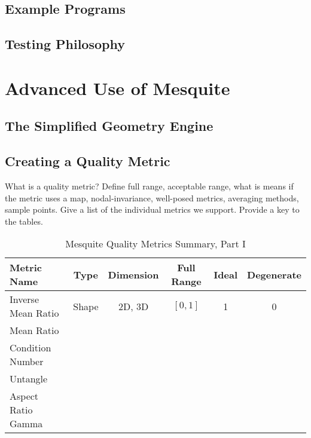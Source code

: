 \subsection{Example Programs}

\subsection{Testing Philosophy}

\section{Advanced Use of Mesquite}

\subsection{The Simplified Geometry Engine}

\subsection{Creating a Quality Metric}
What is a quality metric? Define full range, acceptable range, what is means 
if the metric uses a map, nodal-invariance, well-posed metrics, averaging 
methods, sample points. Give a list of the individual metrics we support. 
Provide a key to the tables.

\begin{table}[h]
\begin{center}
\begin{tabular}{|l|c|c|c|c|c|}
\hline
Metric Name & Type & Dimension & Full Range & Ideal & Degenerate \\ \hline
Inverse Mean Ratio & Shape & 2D, 3D & $[0,1]$ & 1 & 0 \\ 
Mean Ratio &  &  &  &  &  \\ 
Condition Number &  &  &  &  &  \\ 
Untangle &  &  &  &  &  \\ 
Aspect Ratio Gamma &  &  &  &  &  \\ 
\hline
\end{tabular}
\caption{\label{QualityMetrics1} Mesquite Quality Metrics Summary, Part I}
\end{center}
\end{table}

